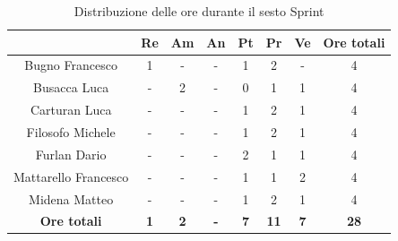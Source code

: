 \begin{table}[H]
  \centering
  \renewcommand{\arraystretch}{1.8}
  \begin{tabular}{c|c|c|c|c|c|c|c}
    \rowcolor[HTML]{125E28}
    \multicolumn{1}{c}{\color[HTML]{FFFFFF}\textbf{ Nominativo }}
                         & \multicolumn{1}{c}{\color[HTML]{FFFFFF}\textbf{ Re }}
                         & \multicolumn{1}{c}{\color[HTML]{FFFFFF}\textbf{ Am}}
                         & \multicolumn{1}{c}{\color[HTML]{FFFFFF}\textbf{ An }}
                         & \multicolumn{1}{c}{\color[HTML]{FFFFFF}\textbf{ Pt }}
                         & \multicolumn{1}{c}{\color[HTML]{FFFFFF}\textbf{ Pr }}
                         & \multicolumn{1}{c}{\color[HTML]{FFFFFF}\textbf{ Ve }}
                         & \multicolumn{1}{c}{\color[HTML]{FFFFFF}\textbf{ Ore totali }}                                                                                 \\
    \hline
    Bugno Francesco      & 1                                                             & -          & -          & 1          & 2           & -          & 4           \\
    Busacca Luca         & -                                                             & 2          & -          & 0          & 1           & 1          & 4           \\
    Carturan Luca        & -                                                             & -          & -          & 1          & 2           & 1          & 4           \\
    Filosofo Michele     & -                                                             & -          & -          & 1          & 2           & 1          & 4           \\
    Furlan Dario         & -                                                             & -          & -          & 2          & 1           & 1          & 4           \\
    Mattarello Francesco & -                                                             & -          & -          & 1          & 1           & 2          & 4           \\
    Midena Matteo        & -                                                             & -          & -          & 1          & 2           & 1          & 4           \\
    \textbf{Ore totali}  & \textbf{1}                                                    & \textbf{2} & \textbf{-} & \textbf{7} & \textbf{11} & \textbf{7} & \textbf{28}
  \end{tabular}
  \caption{Distribuzione delle ore durante il sesto Sprint}
\end{table}


